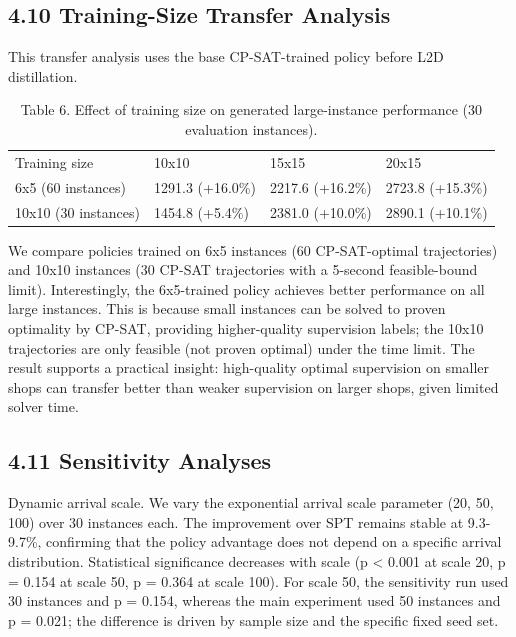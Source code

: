 \documentclass{article}
\begin{document}
\subsection*{4.10 Training-Size Transfer Analysis}

This transfer analysis uses the base CP-SAT-trained policy before L2D distillation.

\begin{table}[h]
\centering
\begin{tabular}{llll}
\toprule
Training size & 10x10 & 15x15 & 20x15 \\
6x5 (60 instances) & 1291.3 (+16.0\%) & 2217.6 (+16.2\%) & 2723.8 (+15.3\%) \\
10x10 (30 instances) & 1454.8 (+5.4\%) & 2381.0 (+10.0\%) & 2890.1 (+10.1\%) \\
\bottomrule
\end{tabular}
\caption{Table 6. Effect of training size on generated large-instance performance (30 evaluation instances).}
\end{table}

We compare policies trained on 6x5 instances (60 CP-SAT-optimal trajectories) and 10x10 instances (30 CP-SAT trajectories with a 5-second feasible-bound limit). Interestingly, the 6x5-trained policy achieves better performance on all large instances. This is because small instances can be solved to proven optimality by CP-SAT, providing higher-quality supervision labels; the 10x10 trajectories are only feasible (not proven optimal) under the time limit. The result supports a practical insight: high-quality optimal supervision on smaller shops can transfer better than weaker supervision on larger shops, given limited solver time.


\subsection*{4.11 Sensitivity Analyses}

Dynamic arrival scale. We vary the exponential arrival scale parameter (20, 50, 100) over 30 instances each. The improvement over SPT remains stable at 9.3-9.7\%, confirming that the policy advantage does not depend on a specific arrival distribution. Statistical significance decreases with scale (p < 0.001 at scale 20, p = 0.154 at scale 50, p = 0.364 at scale 100). For scale 50, the sensitivity run used 30 instances and p = 0.154, whereas the main experiment used 50 instances and p = 0.021; the difference is driven by sample size and the specific fixed seed set.
\end{document}

